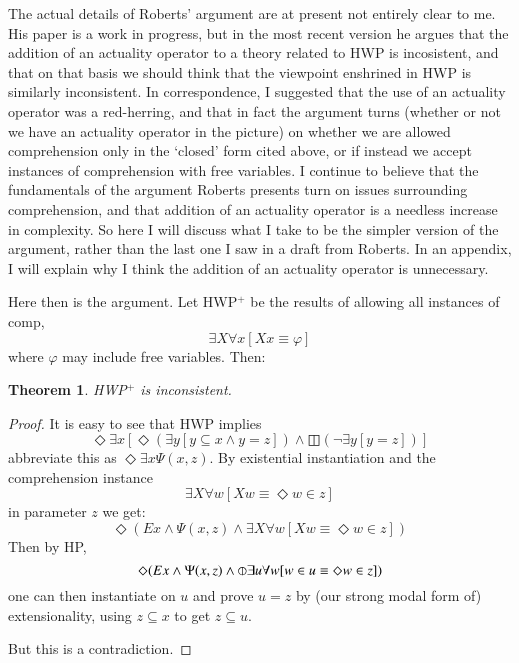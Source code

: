 \documentclass{article}
\newtheorem{theorem}{Theorem}
\begin{document}
The actual details of Roberts' argument are at present not entirely 
clear to me. His paper is a work in progress, but in the most 
recent version he argues that the addition of an actuality operator 
to a theory related to HWP is incosistent, and that on that basis 
we should think that the viewpoint enshrined in HWP is similarly inconsistent.
In correspondence, I suggested that the use of an actuality operator 
was a red-herring, and that in fact the argument turns (whether or not 
we have an actuality operator in the picture) on whether we are allowed 
comprehension only in the `closed' form cited above, or if instead 
we accept instances of comprehension with free variables. I continue 
to believe that the fundamentals of the argument Roberts presents turn 
on issues surrounding comprehension, and that addition of an actuality 
operator is a needless increase in complexity. So here I will discuss 
what I take to be the simpler version of the argument, rather than 
the last one I saw in a draft from Roberts. In an appendix, I will 
explain why I think the addition of an actuality operator is unnecessary.

Here then is the argument. Let HWP$^+$ be the 
results of allowing all instances of comp, 
\[ \exists X \forall x[Xx \equiv \varphi]\]
where $\varphi$ may include free variables. Then:
\begin{theorem}
    HWP$^+$ is inconsistent.
\end{theorem}
\begin{proof}
    It is easy to see that HWP implies
    \begin{equation}
        \Diamond \exists x[\Diamond (\exists y[ y \subseteq x \wedge y = z]) \wedge \boxbar(\neg \exists y[y = z])]
    \end{equation}
    abbreviate this as $\Diamond \exists x \Psi(x, z)$. By 
    existential instantiation and the comprehension instance
    \begin{equation}\label{exa}
        \exists X \forall w[Xw \equiv \Diamond w \in z]
    \end{equation}
    in parameter $z$ we get:
    \begin{equation}\label{xb}
        \Diamond (Ex \wedge \Psi(x, z) \wedge \exists X \forall w[Xw \equiv \Diamond w \in z])
    \end{equation}
    Then by HP, 
    \begin{equation} 
        \Diamond (Ex \wedge \Psi(x, z) \wedge \circledbar \exists u \forall w[w \in u \equiv \Diamond w \in z])
    \end{equation}
    one can then instantiate on $u$ and prove $u = z$ by 
    (our strong modal form of) extensionality, using $ z \subseteq x $
    to get $z \subseteq u$.

    But this is a contradiction.

\end{proof}
\end{document}
